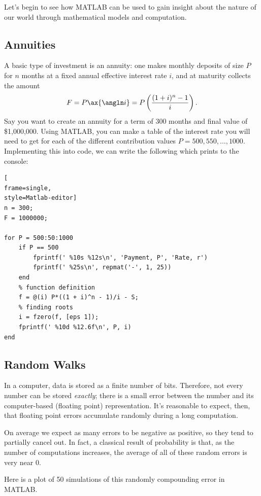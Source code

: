 \documentclass[letterpaper,12pt]{article}
\begin{document}
Let's begin to see how MATLAB can be used to gain insight about the nature of our world through mathematical models and computation.

\pagebreak

\subsection*{Annuities}
A basic type of investment is an annuity: one makes monthly deposits of size $P$ for $n$ months at a fixed annual effective interest rate $i$, and at maturity collects the amount
$$ F = P \ax{\angln i} = P \left(\frac{(1+i)^n - 1}{i}\right). $$ 
Say you want to create an annuity for a term of $300$ months and final value of \$1,000,000. Using MATLAB, you can make a table of the interest rate you will need to get for each of the different contribution values $P = 500, 550, \dots , 1000$. Implementing this into code, we can write the following which prints to the console:
\\
\begin{lstlisting}[
frame=single,
style=Matlab-editor]
n = 300;
F = 1000000;

for P = 500:50:1000
    if P == 500
        fprintf(' %10s %12s\n', 'Payment, P', 'Rate, r')
        fprintf(' %25s\n', repmat('-', 1, 25))
    end
    % function definition
    f = @(i) P*((1 + i)^n - 1)/i - S;	
    % finding roots
    i = fzero(f, [eps 1]);
    fprintf(' %10d %12.6f\n', P, i)
end
\end{lstlisting}

\pagebreak

\subsection*{Random Walks}
In a computer, data is stored as a finite number of bits. Therefore, not every number can be stored \textit{exactly}; there is a small error between the number and its computer-based (floating point) representation.  It’s reasonable to expect, then, that floating point errors accumulate randomly during a long computation. 

On average we expect as many errors to be negative as positive, so they tend to partially cancel out. In fact, a classical result of probability is that, as the number of computations increases, the average of all of these random errors is very near $0$.

Here is a plot of 50 simulations of this randomly compounding error in MATLAB.
\end{document}
